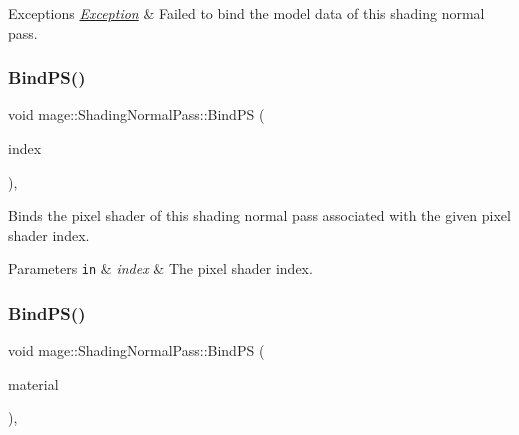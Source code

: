 \begin{DoxyExceptions}{Exceptions}
{\em \hyperlink{classmage_1_1_exception}{Exception}} & Failed to bind the model data of this shading normal pass. \\
\hline
\end{DoxyExceptions}
\hypertarget{classmage_1_1_shading_normal_pass_ab691c2125f9e21c7e70f2737037504bc}{}\label{classmage_1_1_shading_normal_pass_ab691c2125f9e21c7e70f2737037504bc} 
\subsubsection{\texorpdfstring{Bind\+P\+S()}{BindPS()}\hspace{0.1cm}{\footnotesize\ttfamily [1/2]}}
{\footnotesize\ttfamily void mage\+::\+Shading\+Normal\+Pass\+::\+Bind\+PS (\begin{DoxyParamCaption}\item[{\hyperlink{classmage_1_1_shading_normal_pass_a6d277753d26a7854c448b3e0d9275b19}{P\+S\+Index}}]{index }\end{DoxyParamCaption})\hspace{0.3cm}{\ttfamily [private]}, {\ttfamily [noexcept]}}

Binds the pixel shader of this shading normal pass associated with the given pixel shader index.


\begin{DoxyParams}[1]{Parameters}
\mbox{\tt in}  & {\em index} & The pixel shader index. \\
\hline
\end{DoxyParams}
\hypertarget{classmage_1_1_shading_normal_pass_a220c66c7fdbbb16cfeb8515e435cd846}{}\label{classmage_1_1_shading_normal_pass_a220c66c7fdbbb16cfeb8515e435cd846} 
\subsubsection{\texorpdfstring{Bind\+P\+S()}{BindPS()}\hspace{0.1cm}{\footnotesize\ttfamily [2/2]}}
{\footnotesize\ttfamily void mage\+::\+Shading\+Normal\+Pass\+::\+Bind\+PS (\begin{DoxyParamCaption}\item[{const \hyperlink{classmage_1_1_material}{Material} \&}]{material }\end{DoxyParamCaption})\hspace{0.3cm}{\ttfamily [private]}, {\ttfamily [noexcept]}}

